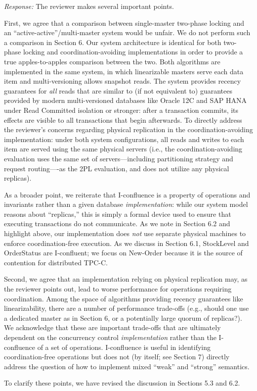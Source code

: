 \documentclass[10pt]{article}
\newcommand{\response}[1] {\noindent\textit{Response: } #1\\}
\begin{document}
\response{The reviewer makes several important points.

  First, we agree that a comparison between single-master two-phase
  locking and an ``active-active''/multi-master system would be
  unfair. We do not perform such a comparison in Section 6.  Our
  system architecture is identical for both two-phase locking and
  coordination-avoiding implementations in order to provide a true
  apples-to-apples comparison between the two. Both algorithms are
  implemented in the same system, in which linearizable masters serve
  each data item and multi-versioning allows snapshot reads. The
  system provides recency guarantees for \textit{all} reads that are
  similar to (if not equivalent to) guarantees provided by modern
  multi-versioned databases like Oracle 12C and SAP HANA under Read
  Committed isolation or stronger: after a transaction commits, its
  effects are visible to all transactions that begin afterwards. To
  directly address the reviewer's concerns regarding physical
  replication in the coordination-avoiding implementation: under both
  system configurations, all reads and writes to each item are served
  using the same physical servers (i.e., the coordination-avoiding
  evaluation uses the same set of servers---including partitioning
  strategy and request routing----as the 2PL evaluation, and does not
  utilize any physical replicas).

  As a broader point, we reiterate that I-confluence is a property of
  operations and invariants rather than a given database
  \textit{implementation}: while our system model reasons about
  ``replicas,'' this is simply a formal device used to ensure that
  executing transactions do not communicate. As we note in Section 6.2
  and highlight above, our implementation does \textit{not} use
  separate physical machines to enforce coordination-free
  execution. As we discuss in Section 6.1, StockLevel and OrderStatus
  are I-confluent; we focus on New-Order because
  it is the source of contention for distributed TPC-C.

  Second, we agree that an implementation relying on physical
  replication may, as the reviewer points out, lead to worse
  performance for operations requiring coordination. Among the space
  of algorithms providing recency guarantees like linearizability,
  there are a number of performance trade-offs (e.g., should one use a
  dedicated master as in Section 6, or a potentially large quorum of
  replicas?). We acknowledge that these are important trade-offs that
  are ultimately dependent on the concurrency control
  \textit{implementation} rather than the I-confluence of a set of
  operations. I-confluence is useful in identifying coordination-free
  operations but does not (by itself; see Section 7) directly address
  the question of how to implement mixed ``weak'' and ``strong''
  semantics.

  To clarify these points, we have revised the discussion in Sections 5.3 and 6.2.}
\end{document}
